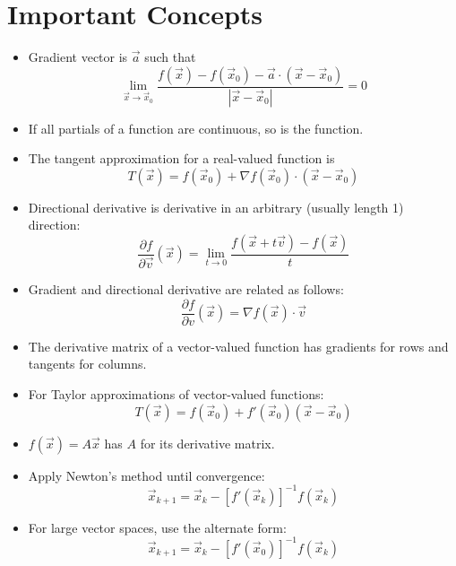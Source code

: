 \documentclass[11pt]{article}
\begin{document}
\section*{Important Concepts}
	\begin{itemize}
		\item Gradient vector is $\vec{a}$ such that \[\lim_{\vec{x} \rightarrow \vec{x}_0} \frac{f(\vec{x}) - f(\vec{x}_0) - \vec{a}\cdot (\vec{x} - \vec{x}_0)}{|\vec{x} - \vec{x}_0|} = 0\]
		\item If all partials of a function are continuous, so is the function.
		\item The tangent approximation for a real-valued function is \[T(\vec{x}) = f(\vec{x}_0) + \nabla f(\vec{x}_0) \cdot (\vec{x}-\vec{x}_0)\]
		\item Directional derivative is derivative in an arbitrary (usually length 1) direction:
			\[\frac{\partial f}{\partial \vec{v}} (\vec{x}) = \lim_{t \rightarrow 0} \frac{f(\vec{x} + t\vec{v}) - f(\vec{x})}{t}\]
		\item Gradient and directional derivative are related as follows: \[\frac{\partial f}{\partial v} (\vec{x}) = \nabla f(\vec{x}) \cdot \vec{v}\]
		\item The derivative matrix of a vector-valued function has gradients for rows and tangents for columns.
		\item For Taylor approximations of vector-valued functions:
			\[T(\vec{x}) = f(\vec{x}_0) + f'(\vec{x}_0)(\vec{x}-\vec{x}_0)\]
		\item $f(\vec{x}) = A\vec{x}$ has $A$ for its derivative matrix.
		\item Apply Newton's method until convergence:
			\[\vec{x}_{k+1} = \vec{x}_k - [f'(\vec{x}_k)]^{-1} f(\vec{x}_k)\]
		\item For large vector spaces, use the alternate form:
			\[\vec{x}_{k+1} = \vec{x}_k - [f'(\vec{x}_0)]^{-1} f(\vec{x}_k)\]
	\end{itemize}
%		
%		


\end{document}

